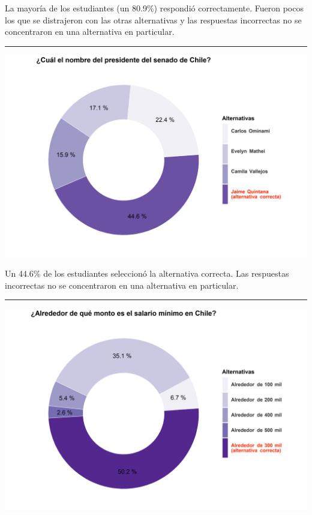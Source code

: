 \documentclass[
  14pt,
]{book}
\let\origfigure\figure
\let\endorigfigure\endfigure
\renewenvironment{figure}[1][2] {
  \expandafter\origfigure\expandafter[H]
} {
  \endorigfigure
}
\begin{document}
La mayoría de los estudiantes (un 80.9\%) respondió correctamente. Fueron pocos los que se distrajeron con las otras alternativas y las respuestas incorrectas no se concentraron en una alternativa en particular.

\begin{center}\rule{0.5\linewidth}{0.5pt}\end{center}

\begin{figure}[!ht]

{\centering \includegraphics[width=0.8\linewidth,]{images/ccivico_9} 

}

\caption{Presidente del senado de Chile}\label{fig:unnamed-chunk-13}
\end{figure}

Un 44.6\% de los estudiantes seleccionó la alternativa correcta. Las respuestas incorrectas no se concentraron en una alternativa en particular.

\begin{center}\rule{0.5\linewidth}{0.5pt}\end{center}

\begin{figure}[!ht]

{\centering \includegraphics[width=0.8\linewidth,]{images/ccivico_10} 

}

\caption{Salario mínimo en Chile}\label{fig:unnamed-chunk-14}
\end{figure}
\end{document}
